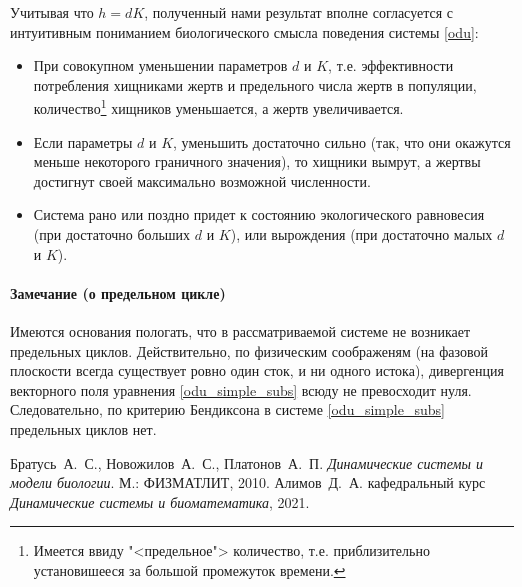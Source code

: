 \documentclass[oneside,final,12pt]{article}
\theoremstyle{plain}
\theoremstyle{remark}
\theoremstyle{definition}
\theoremstyle{plain}
\begin{document}
		Учитывая что \(h = dK\), полученный нами результат вполне согласуется с интуитивным пониманием биологического смысла поведения системы \eqref{odu}:
		\begin{itemize}
			\item При совокупном уменьшении параметров \(d\) и \(K\), т.е. эффективности потребления хищниками жертв и предельного числа жертв в популяции, количество\footnote{Имеется ввиду "<предельное"> количество, т.е. приблизительно установишееся за большой промежуток времени.} хищников уменьшается, а жертв увеличивается.
			\item Если параметры \(d\) и \(K\), уменьшить достаточно сильно (так, что они окажутся меньше некоторого граничного значения), то хищники вымрут, а жертвы достигнут своей максимально возможной численности.
			\item Система рано или поздно придет к состоянию экологического равновесия (при достаточно больших \(d\) и \(K\)), или вырождения (при достаточно малых \(d\) и \(K\)).
		\end{itemize}

		\paragraph{Замечание (о предельном цикле)}  Имеются основания пологать, что в рассматриваемой системе не возникает предельных циклов. Действительно, по физическим соображеням (на фазовой плоскости всегда существует ровно один сток, и ни одного истока), дивергенция векторного поля уравнения \eqref{odu_simple_subs} всюду не превосходит нуля. Следовательно, по критерию Бендиксона в системе \eqref{odu_simple_subs} предельных циклов нет.

	\bigskip
	\bigskip
	\bigskip
	\begin{thebibliography}{0}
		 Братусь~А.~С., Новожилов~А.~С., Платонов~А.~П.
			\emph{Динамические системы и модели биологии}. М.: ФИЗМАТЛИТ, 2010.
		 Алимов~Д.~А. кафедральный курс 
			\emph{Динамические системы и биоматематика}, 2021.
	\end{thebibliography}
\end{document}
